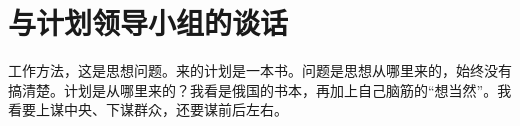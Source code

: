 \section[与计划领导小组的谈话（一九六四年九月十二日）]{与计划领导小组的谈话}


工作方法，这是思想问题。来的计划是一本书。问题是思想从哪里来的，始终没有搞清楚。计划是从哪里来的？我看是俄国的书本，再加上自己脑筋的“想当然”。我看要上谋中央、下谋群众，还要谋前后左右。


